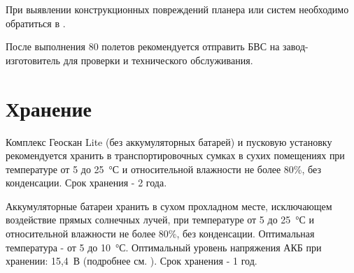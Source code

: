 \documentclass[a4paper,10pt,russian,openany]{sphinxmanual}
\begin{document}
При выявлении конструкционных повреждений планера или систем необходимо обратиться в .

После выполнения 80 полетов рекомендуется отправить БВС на завод-изготовитель для проверки и технического обслуживания.


\section{Хранение}
\label{\detokenize{reference:id6}}
Комплекс Геоскан Lite (без аккумуляторных батарей) и пусковую установку рекомендуется хранить в транспортировочных сумках в сухих помещениях при температуре от 5 до 25 °С и относительной влажности не более 80\%, без конденсации. Срок хранения - 2 года.

Аккумуляторные батареи хранить в сухом прохладном месте, исключающем воздействие прямых солнечных лучей, при температуре от 5 до 25 °С и относительной влажности не более 80\%, без конденсации. Оптимальная температура - от 5 до 10 °С. Оптимальный уровень напряжения АКБ при хранении: 15,4 В (подробнее см. {\hyperref[\detokenize{charger::doc}]{}}). Срок хранения - 1 год.
\end{document}
